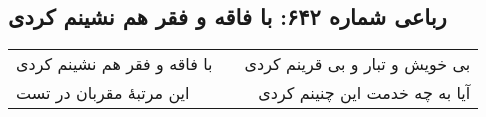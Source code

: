 \begin{center}
\section*{رباعی شماره ۶۴۲: با فاقه و فقر هم نشینم کردی}
\label{sec:sh642}
\begin{longtable}{l p{0.5cm} r}
با فاقه و فقر هم نشینم کردی
&&
بی خویش و تبار و بی قرینم کردی
\\
این مرتبهٔ مقربان در تست
&&
آیا به چه خدمت این چنینم کردی
\\
\end{longtable}
\end{center}
